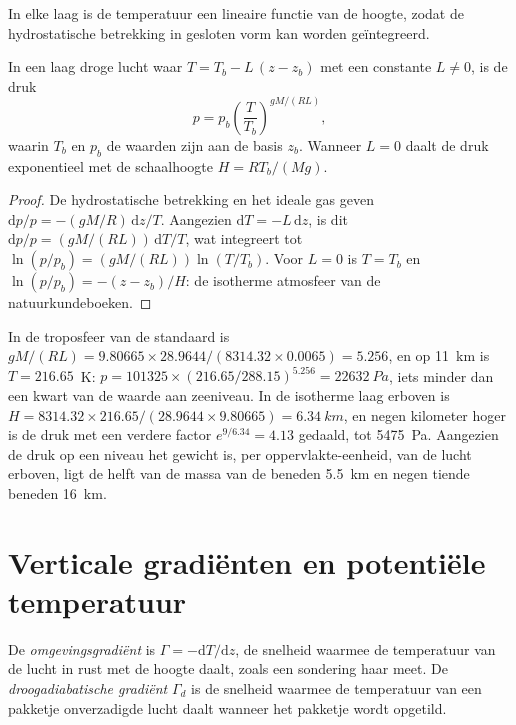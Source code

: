 In elke laag is de temperatuur een lineaire functie van de hoogte, zodat de hydrostatische betrekking in gesloten vorm kan worden geïntegreerd.

\begin{proposition}\label{prop:b1:fluid-envelopes-structure:layer-pressure}
In een laag droge lucht waar $T = T_b - L\,(z - z_b)$ met een constante $L \neq 0$, is de druk
\[
  p = p_b \left(\frac{T}{T_b}\right)^{gM/(RL)},
\]
waarin $T_b$ en $p_b$ de waarden zijn aan de basis $z_b$. Wanneer $L = 0$ daalt de druk exponentieel met de schaalhoogte $H = RT_b/(Mg)$.
\end{proposition}

\begin{proof}
De hydrostatische betrekking en het ideale gas geven $\mathrm dp/p = -(gM/R)\,\mathrm
dz/T$. Aangezien $\mathrm dT = -L\,\mathrm dz$, is dit $\mathrm dp/p =
(gM/(RL))\,\mathrm dT/T$, wat integreert tot $\ln(p/p_b) = (gM/(RL))
\ln(T/T_b)$. Voor $L = 0$ is $T = T_b$ en $\ln(p/p_b) = -(z - z_b)/H$: de
isotherme atmosfeer van de natuurkundeboeken.
\end{proof}

In de troposfeer van de standaard is $gM/(RL) = 9.80665 \times 28.9644 /
(8314.32 \times 0.0065) = 5.256$, en op \qty{11}{km} is $T = 216.65$~K:
$p = \num{101325} \times (216.65/288.15)^{5.256} = \qty{22632}{Pa}$, iets
minder dan een kwart van de waarde aan zeeniveau. In de isotherme laag erboven is $H =
8314.32 \times 216.65/(28.9644 \times 9.80665) = \qty{6.34}{km}$, en negen
kilometer hoger is de druk met een verdere factor $e^{9/6.34} =
4.13$ gedaald, tot \qty{5475}{Pa}. Aangezien de druk op een niveau het gewicht is, per
oppervlakte-eenheid, van de lucht erboven, ligt de helft van de massa van de  beneden
\qty{5.5}{km} en negen tiende beneden \qty{16}{km}.

\section{Verticale gradiënten en potentiële temperatuur}\label{sec:b1:fluid-envelopes-structure:lapse}

\begin{definition}\label{def:b1:fluid-envelopes-structure:lapse-rate}
De \emph{omgevingsgradiënt} is $\Gamma =
-\mathrm dT/\mathrm dz$, de snelheid waarmee de temperatuur van de lucht in rust met de hoogte daalt, zoals een sondering haar meet. De \emph{droogadiabatische
gradiënt} $\Gamma_d$ is de snelheid waarmee de temperatuur van een pakketje onverzadigde lucht daalt wanneer het pakketje wordt opgetild.
\end{definition}

